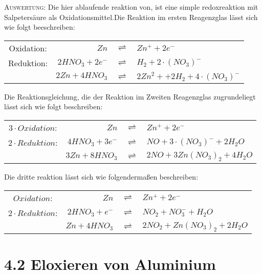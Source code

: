 \documentclass[11pt, a4paper]{article}
\begin{document}
\textsc{Auswertung:}\hspace{8mm} Die hier ablaufende reaktion von, ist eine simple redoxreaktion mit Salpetersäure als Oxidationsmittel.Die Reaktion im ersten Reagenzglas lässt sich wie folgt beeschreiben:
\begin{center}
\begin{tabular}{crcl}
Oxidation: & $Zn$ & $\displaystyle{\rightleftharpoons}$ & $Zn^+ + 2e^-$\\
Reduktion: & $2HNO_3 + 2e^-$ & $\displaystyle{\rightleftharpoons}$ & $H_2 + 2\cdot (NO_3)^-$\\
\hline
	& $2Zn + 4HNO_3$ & $\displaystyle{\rightleftharpoons}$ & $2Zn^2+ +2H_2 + 4\cdot (NO_3)^-$
\end{tabular}
\end{center}

Die Reaktionsgleichung, die der Reaktion im Zweiten Reagenzglas zugrundeliegt lässt sich wie folgt beschreiben:

\begin{center}
\begin{tabular}{crcl}
$3\cdot Oxidation$: & $Zn$ & $\displaystyle{\rightleftharpoons}$ & $Zn^+ + 2e^-$\\
$2\cdot Reduktion$: & $4HNO_3 + 3e^-$ & $\displaystyle{\rightleftharpoons}$ & $NO + 3\cdot (NO_3)^- + 2H_2O$\\
\hline
	& $3Zn + 8HNO_3$ & $\displaystyle{\rightleftharpoons}$ & $2NO + 3Zn(NO_3)_2 + 4H_2O$
\end{tabular}
\end{center}

Die dritte reaktion lässt sich wie folgendermaßen beschreiben:

\begin{center}
\begin{tabular}{crcl}
$Oxidation$: & $Zn$ & $\displaystyle{\rightleftharpoons}$ & $Zn^+ + 2e^-$\\
$2\cdot Reduktion$: & $2HNO_3 + e^-$ & $\displaystyle{\rightleftharpoons}$ & $NO_2 + NO_3^- + H_2O$\\
\hline
	& $Zn + 4HNO_3$ & $\displaystyle{\rightleftharpoons}$ & $2NO_2 + Zn(NO_3)_2 + 2H_2O$
\end{tabular}
\end{center}


\newpage
\section{4.2 Eloxieren von Aluminium}
\end{document}
